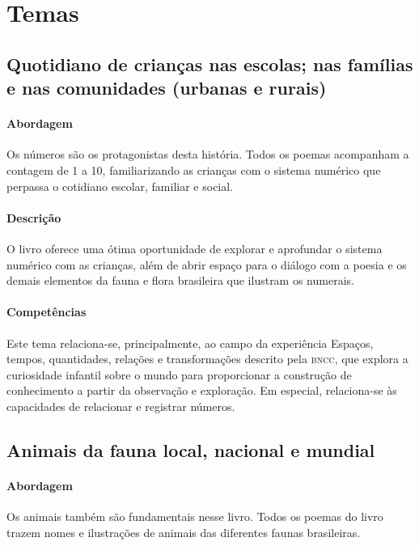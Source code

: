 \documentclass[11pt]{extarticle}
\begin{document}
\section{Temas}

\subsection{Quotidiano de crianças nas escolas; nas famílias e nas comunidades (urbanas e rurais)}

\paragraph{Abordagem} Os números são os protagonistas desta história. 
Todos os poemas acompanham a contagem de 1 a 10, familiarizando as crianças com o sistema numérico que perpassa o cotidiano escolar, familiar e social.

\paragraph{Descrição} O livro oferece uma ótima oportunidade de explorar 
e aprofundar o sistema numérico com as crianças, além de abrir espaço para o diálogo com a poesia e os demais elementos da fauna e flora brasileira que ilustram os numerais.

\paragraph{Competências} Este tema relaciona-se, principalmente, ao 
campo da experiência Espaços, tempos, quantidades, relações e transformações 
descrito pela \textsc{bncc}, que explora a curiosidade infantil sobre o mundo 
para proporcionar a construção de conhecimento a partir da observação e exploração.
Em especial, relaciona-se às capacidades de relacionar e registrar números.

\subsection{Animais da fauna local, nacional e mundial}

\paragraph{Abordagem} Os animais também são fundamentais nesse livro. 
Todos os poemas do livro trazem nomes e ilustrações de animais das diferentes faunas brasileiras.
\end{document}
